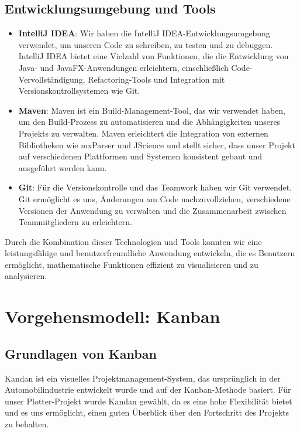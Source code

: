 \documentclass[a4paper]{article}
\begin{document}
\subsection{Entwicklungsumgebung und Tools}

\begin{itemize}
\item \textbf{IntelliJ IDEA}: Wir haben die IntelliJ IDEA-Entwicklungsumgebung verwendet, um unseren Code zu schreiben, zu testen und zu debuggen. IntelliJ IDEA bietet eine Vielzahl von Funktionen, die die Entwicklung von Java- und JavaFX-Anwendungen erleichtern, einschließlich Code-Vervollständigung, Refactoring-Tools und Integration mit Versionskontrollsystemen wie Git.

\item \textbf{Maven}: Maven ist ein Build-Management-Tool, das wir verwendet haben, um den Build-Prozess zu automatisieren und die Abhängigkeiten unseres Projekts zu verwalten. Maven erleichtert die Integration von externen Bibliotheken wie mxParser und JScience und stellt sicher, dass unser Projekt auf verschiedenen Plattformen und Systemen konsistent gebaut und ausgeführt werden kann.

\newpage

\item \textbf{Git}: Für die Versionskontrolle und das Teamwork haben wir Git verwendet. Git ermöglicht es uns, Änderungen am Code nachzuvollziehen, verschiedene Versionen der Anwendung zu verwalten und die Zusammenarbeit zwischen Teammitgliedern zu erleichtern.
\end{itemize}

Durch die Kombination dieser Technologien und Tools konnten wir eine leistungsfähige und benutzerfreundliche Anwendung entwickeln, die es Benutzern ermöglicht, mathematische Funktionen effizient zu visualisieren und zu analysieren.

\newpage

\section{Vorgehensmodell: Kanban}
\subsection{Grundlagen von Kanban}
Kandan ist ein visuelles Projektmanagement-System, das ursprünglich in der Automobilindustrie entwickelt wurde und auf der Kanban-Methode basiert. Für unser Plotter-Projekt wurde Kandan gewählt, da es eine hohe Flexibilität bietet und es uns ermöglicht, einen guten Überblick über den Fortschritt des Projekts zu behalten.
\end{document}
